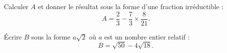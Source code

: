 \begin{myenumerate}
\item Calculer $A$ et donner le résultat sous la forme d'une fraction irréductible :
\[A=\frac23-\frac73\times\dfrac8{21}.\]
\item\'Ecrire $B$ sous la forme $a\sqrt2$ où $a$ est un nombre entier relatif :
\[B=\sqrt{50} - 4\sqrt{18}.\]
\end{myenumerate}